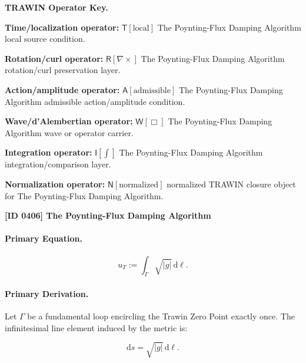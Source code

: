 \par\vspace{0.45\baselineskip}
\noindent\begin{minipage}[t]{\linewidth}
\begingroup
\small
\raggedright
\textbf{TRAWIN Operator Key.}\par
\noindent\textbf{Time/localization operator:} $\mathsf{T}\!\left[\mathrm{local}\right]$ The Poynting-Flux Damping Algorithm local source condition.\par
\noindent\textbf{Rotation/curl operator:} $\mathsf{R}\!\left[\nabla\times\right]$ The Poynting-Flux Damping Algorithm rotation/curl preservation layer.\par
\noindent\textbf{Action/amplitude operator:} $\mathsf{A}\!\left[\mathrm{admissible}\right]$ The Poynting-Flux Damping Algorithm admissible action/amplitude condition.\par
\noindent\textbf{Wave/d'Alembertian operator:} $\mathsf{W}\!\left[\Box\right]$ The Poynting-Flux Damping Algorithm wave or operator carrier.\par
\noindent\textbf{Integration operator:} $\mathsf{I}\!\left[\int\right]$ The Poynting-Flux Damping Algorithm integration/comparison layer.\par
\noindent\textbf{Normalization operator:} $\mathsf{N}\!\left[\mathrm{normalized}\right]$ normalized TRAWIN closure object for The Poynting-Flux Damping Algorithm.\par
\endgroup
\end{minipage}

\clearpage
\noindent\textbf{[ID 0406] The Poynting-Flux Damping Algorithm}\par
\vspace{0.35em}
\paragraph{Primary Equation.}
\begin{equation}
u_T := \int_{\Gamma}\sqrt{|g|}\,\mathrm{d}\ell .
\end{equation}

\paragraph{Primary Derivation.}
Let $\Gamma$ be a fundamental loop encircling the Trawin Zero Point exactly once.  
The infinitesimal line element induced by the metric is:

\begin{equation}
\mathrm{d}s = \sqrt{|g|}\,\mathrm{d}\ell .
\end{equation}

